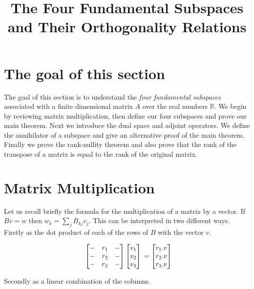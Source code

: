 \documentclass[11pt]{article}
\title{The Four Fundamental Subspaces and Their Orthogonality Relations}
\author{}
\date{}
\begin{document}
\maketitle

\Large

\section*{The goal of this section}

The goal of this section is to understand the \emph{four fundamental subspaces} associated with a finite dimensional matrix $A$ over the real numbers $\mathbb{R}$. We begin by reviewing matrix multiplication, then define our four subspaces and prove our main theorem. Next we introduce the dual space and adjoint operators. We define the annihilator of a subspace and give an alternative proof of the main theorem. Finally we prove the rank-nullity theorem and also prove that the rank of the transpose of a matrix is equal to the rank of the original matrix.

\section*{Matrix Multiplication}

Let us recall briefly the formula for the multiplication of a matrix by a vector. If $B v = w$ then $w_k = \sum_j B_{kj} v_j$. This can be interpreted in two different ways. Firstly as the dot product of each of the rows of $B$ with the vector $v$.


\[
\begin{array}{c@{\,}c}
\begin{bmatrix}
- & r_1 & - \\
- & r_2 & - \\
- & r_3 & - \\
\end{bmatrix}
\begin{bmatrix}
v_1 \\
v_2 \\
v_3 \\
\end{bmatrix}
\end{array}
=
\begin{bmatrix}
r_1 . v \\
r_2 . v \\
r_3 . v \\
\end{bmatrix}
\]

Secondly as a linear combination of the columns.
\end{document}
